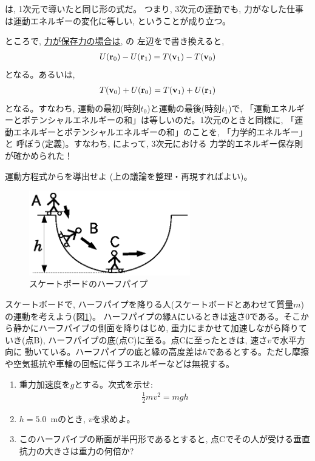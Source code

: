 は, 1次元で導いたと同じ形の式だ。
つまり, 3次元の運動でも, 力がなした仕事は運動エネルギーの変化に等しい, 
ということが成り立つ。

ところで, \underline{力が保存力の場合は}, の
左辺をで書き換えると, 
\begin{eqnarray}
U({\bf r}_0)-U({\bf r}_1)=T({\bf v}_1)-T({\bf v}_0)\label{3D_work_conservative0}
\end{eqnarray}
となる。あるいは, 
\begin{eqnarray}
T({\bf v}_0)+U({\bf r}_0)=T({\bf v}_1)+U({\bf r}_1)\label{3D_work_conservative1}
\end{eqnarray}
となる。すなわち, 運動の最初(時刻$t_0$)と運動の最後(時刻$t_1$)で, 
「運動エネルギーとポテンシャルエネルギーの和」は等しいのだ。1次元のときと同様に, 
「運動エネルギーとポテンシャルエネルギーの和」のことを, 「力学的エネルギー」と
呼ぼう(定義)。すなわち, によって, 3次元における
力学的エネルギー保存則が確かめられた！\\

\begin{q}\label{q:consmom3D} 運動方程式からを導出せよ
(上の議論を整理・再現すればよい)。\end{q}


\begin{figure}[h]
    \centering
    \includegraphics[width=7cm]{half_pipe.eps}
    \caption{スケートボードのハーフパイプ}\label{fig:half_pipe}
\end{figure}
\begin{q}\label{q:half_pipe}
スケートボードで, ハーフパイプを降りる人(スケートボードとあわせて質量$m$)の運動を考えよう(図\ref{fig:half_pipe})。
ハーフパイプの縁Aにいるときは速さ0である。そこから静かにハーフパイプの側面を降りはじめ, 
重力にまかせて加速しながら降りていき(点B), ハーフパイプの底(点C)に至る。点Cに至ったときは, 速さ$v$で水平方向に
動いている。ハーフパイプの底と縁の高度差は$h$であるとする。ただし摩擦や空気抵抗や車輪の回転に伴うエネルギーなどは無視する。
\begin{enumerate}
\item 重力加速度を$g$とする。次式を示せ:
\begin{eqnarray}\frac{1}{2}mv^2=mgh\end{eqnarray}
\item $h=5.0$~mのとき, $v$を求めよ。
\item このハーフパイプの断面が半円形であるとすると, 点Cでその人が受ける垂直抗力の大きさは重力の何倍か?
\end{enumerate}\end{q}

